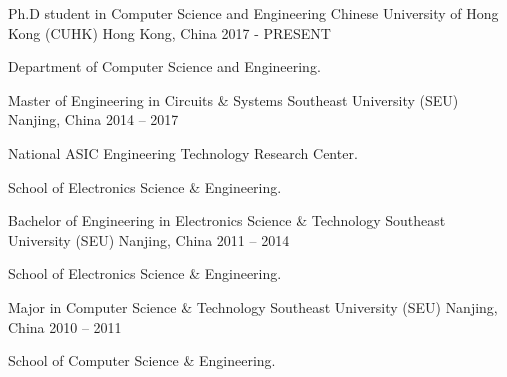 


\begin{cventries}



\cventry
{Ph.D student in Computer Science and Engineering}
{Chinese University of Hong Kong (CUHK)}
{Hong Kong, China}
{2017 - PRESENT}
{
\begin{cvitems}
\item {Department of Computer Science and Engineering.}
\end{cvitems}
}



\cventry
{Master of Engineering in Circuits \& Systems}
{Southeast University (SEU)}
{Nanjing, China}
{2014 -- 2017}
{
\begin{cvitems}
\item {National ASIC Engineering Technology Research Center.}
\item {School of Electronics Science \& Engineering.}
\end{cvitems}
}

\cventry
{Bachelor of Engineering in Electronics Science \& Technology}
{Southeast University (SEU)}
{Nanjing, China}
{2011 -- 2014}
{
\begin{cvitems}
\item {School of Electronics Science \& Engineering.}
\end{cvitems}
}

\cventry
{Major in Computer Science \& Technology}
{Southeast University (SEU)}
{Nanjing, China}
{2010 -- 2011}
{
\begin{cvitems}
\item {School of Computer Science \& Engineering.}
\end{cvitems}
}






\end{cventries}